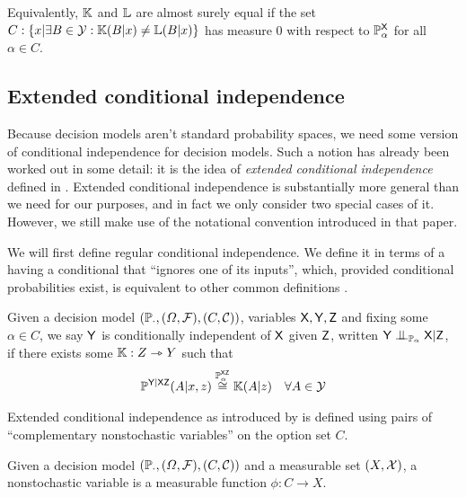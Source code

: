 Equivalently, $\mathbb{K}$ and $\mathbb{L}$ are almost surely equal if the set $C:\{x|\exists B\in\mathcal{Y}:\mathbb{K}(B|x)\neq\mathbb{L}(B|x)\}$ has measure 0 with respect to $\mathbb{P}_\alpha^{\mathsf{X}}$ for all $\alpha\in C$.

\subsection{Extended conditional independence}\label{sec:eci}

Because decision models aren't standard probability spaces, we need some version of conditional independence for decision models. Such a notion has already been worked out in some detail: it is the idea of \emph{extended conditional independence} defined in \citet{constantinou_extended_2017}. Extended conditional independence is substantially more general than we need for our purposes, and in fact we only consider two special cases of it. However, we still make use of the notational convention introduced in that paper.

We will first define regular conditional independence. We define it in terms of a having a conditional that ``ignores one of its inputs'', which, provided conditional probabilities exist, is equivalent to other common definitions \cite{fritz_synthetic_2020}.

\begin{definition}\label{def:ci}
Given a decision model $(\mathbb{P}_\cdot, (\Omega,\mathcal{F}), (C,\mathcal{C}))$, variables $\mathsf{X},\mathsf{Y},\mathsf{Z}$ and fixing some $\alpha\in C$, we say $\mathsf{Y}$ is conditionally independent of $\mathsf{X}$ given $\mathsf{Z}$, written $\RV{Y}\CI_{\model{P}_{\alpha}}\RV{X}|\RV{Z}$, if there exists some $\mathbb{K}:Z\rightarrowtriangle Y$ such that
\begin{align}
    \mathbb{P}^{\mathsf{Y}|\mathsf{XZ}}(A|x,z) &\overset{\mathbb{P}_\alpha^{\mathsf{XZ}}}{\cong} \mathbb{K}(A|z)&\forall A\in \mathcal{Y}
\end{align}
\end{definition}

Extended conditional independence as introduced by \citet{constantinou_extended_2017} is defined using pairs of  ``complementary nonstochastic variables'' on the option set $C$.

\begin{definition}\label{def:nonstoc_var}
Given a decision model $(\mathbb{P}_\cdot,(\Omega,\mathcal{F}),(C,\mathcal{C}))$ and a measurable set $(X,\mathcal{X})$, a nonstochastic variable is a measurable function $\phi:C\to X$.
\end{definition}

